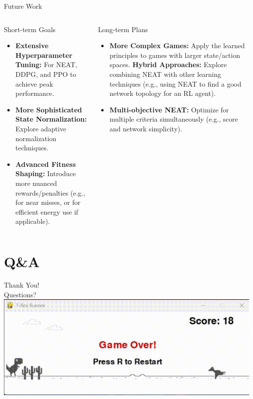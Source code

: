 \documentclass{beamer}
\begin{document}
\begin{frame}{Future Work}
  \begin{columns}[T]
    \begin{column}{0.5\textwidth}
      \begin{block}{Short-term Goals}
        \begin{itemize}
            \item \textbf{Extensive Hyperparameter Tuning:} For NEAT, DDPG, and PPO to achieve peak performance.
            \item \textbf{More Sophisticated State Normalization:} Explore adaptive normalization techniques.
            \item \textbf{Advanced Fitness Shaping:} Introduce more nuanced rewards/penalties (e.g., for near misses, or for efficient energy use if applicable).
        \end{itemize}
      \end{block}
    \end{column}
    \begin{column}{0.5\textwidth}
      \begin{block}{Long-term Plans}
        \begin{itemize}
            \item \textbf{More Complex Games:} Apply the learned principles to games with larger state/action spaces.
            \textbf{Hybrid Approaches:} Explore combining NEAT with other learning techniques (e.g., using NEAT to find a good network topology for an RL agent).
            \item \textbf{Multi-objective NEAT:} Optimize for multiple criteria simultaneously (e.g., score and network simplicity).
        \end{itemize}
      \end{block}
    \end{column}
  \end{columns}
\end{frame}


\section{Q\&A}
\begin{frame}
  \begin{center}
    \Huge Thank You!
    \vspace{1cm} \\
    \Large Questions?
    \vspace{2cm} \\
    \includegraphics[width=0.4\linewidth]{media/over.jpg}
  \end{center}
\end{frame}
\end{document}

